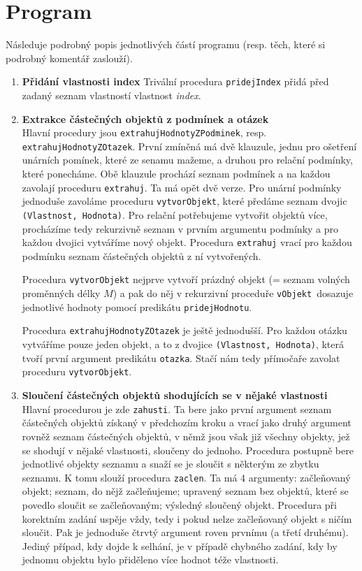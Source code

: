 \documentclass[11pt]{article} %
\begin{document}
\section{Program}
Následuje podrobný popis jednotlivých částí programu (resp. těch, které si podrobný komentář zaslouží).
\begin{enumerate}
\item \textbf{Přidání vlastnosti index}
Trivální procedura \texttt{pridejIndex} přidá před zadaný seznam vlastností vlastnost \emph{index}.
\item \textbf{Extrakce částečných objektů z podmínek a otázek} \\
Hlavní procedury jsou \texttt{extrahujHodnotyZPodminek}, resp. \texttt{extrahujHodnotyZOtazek}. Prv\-ní zmíněná má dvě klauzule, jednu pro ošetření unárních pomínek, které ze senamu mažeme, a druhou pro relační podmínky, které ponecháme. Obě klauzule prochází seznam podmínek a na každou zavolají proceduru \texttt{extrahuj}. Ta má opět dvě verze. Pro unární podmínky jednoduše zavoláme proceduru \texttt{vytvorObjekt}, které předáme seznam dvojic \texttt{(Vlastnost, Hodnota)}. Pro relační potřebujeme vytvořit objektů více, procházíme tedy rekurzivně seznam v prvním argumentu podmínky a pro každou dvojici vytváříme nový objekt. Procedura \texttt{extrahuj} vrací pro každou podmínku seznam částečných objektů z ní vytvořených. 

Procedura \texttt{vytvorObjekt} nejprve vytvoří prázdný objekt (= seznam volných proměnných délky $M$) a pak do něj v rekurzivní proceduře \texttt{vObjekt }dosazuje jednotlivé hodnoty pomocí predikátu \texttt{pridejHodnotu}.

Procedura  \texttt{extrahujHodnotyZOtazek} je ještě jednodušší. Pro každou otázku vytváříme pouze jeden objekt, a to z dvojice \texttt{(Vlastnost, Hodnota)}, která tvoří první argument predikátu \texttt{otazka}. Stačí nám tedy přímočaře zavolat proceduru \texttt{vytvorObjekt}.

\item \textbf{Sloučení částečných objektů shodujících se v nějaké vlastnosti} \\
Hlavní procedurou je zde \texttt{zahusti}. Ta bere jako první argument seznam částečných objektů získaný v předchozím kroku a vrací jako druhý argument rovněž seznam částečných objektů, v němž jsou však již všechny objekty, jež se shodují v nějaké vlastnosti, sloučeny do jednoho. Procedura postupně bere jednotlivé objekty seznamu a snaží se je sloučit s některým ze zbytku seznamu. K tomu slouží procedura \texttt{zaclen}. Ta má 4 argumenty: začleňovaný objekt; seznam, do nějž začleňujeme; upravený seznam bez objektů, které se povedlo sloučit se začleňovaným; výsledný sloučený objekt. Procedura při korektním zadání uspěje vždy, tedy i pokud nelze začleňovaný objekt s ničím sloučit. Pak je jednoduše čtrvtý argument roven prvnímu (a třetí druhému). Jediný případ, kdy dojde k selhání, je v případě chybného zadání, kdy by jednomu objektu bylo přiděleno více hodnot  téže vlastnosti. 


\end{enumerate}
\end{document}
